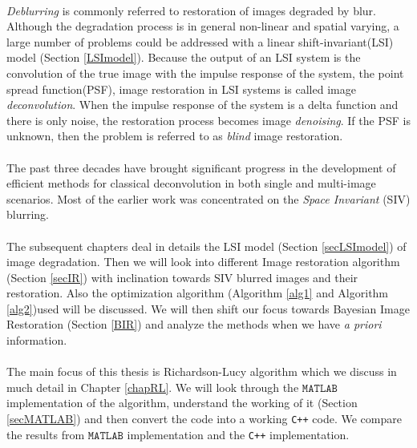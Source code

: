 \documentclass[a4paper]{book}
\begin{document}
	\paragraph*{} \textit{Deblurring} is commonly referred to restoration of images degraded by blur. Although the degradation process is in general non-linear and spatial varying, a large number of problems could be addressed with a linear shift-invariant(LSI) model (Section \ref{LSImodel}). Because the output of an LSI system is the convolution of the true image with the impulse response of the system, the point spread function(PSF), image restoration in LSI systems is called image \textit{deconvolution}. When the impulse response of the system is a delta function and there is only noise, the restoration process becomes image \textit{denoising}. If the PSF is unknown, then the problem is referred to as \textit{blind} image restoration.\cite{bookchapt2}
	
	\paragraph*{}The past three decades have brought significant progress in the development of efficient methods for classical deconvolution in both single and multi-image scenarios. Most of the earlier work was concentrated on the \textit{Space Invariant} (SIV) blurring.\cite{bookchapt3} 
	
	\paragraph*{}The subsequent chapters deal in details the LSI model (Section \ref{secLSImodel}) of image degradation. Then we will look into different Image restoration algorithm (Section \ref{secIR}) with inclination towards SIV blurred images and their restoration. Also the optimization algorithm (Algorithm \ref{alg1} and Algorithm \ref{alg2})used will be discussed.
	We will then shift our focus towards Bayesian Image Restoration (Section \ref{BIR}) and analyze the methods when we have \textit{a priori} information.
	\paragraph*{} The main focus of this thesis is Richardson-Lucy algorithm which we discuss in much detail in Chapter \ref{chapRL}. We will look through the $ \mathtt{MATLAB} $ implementation of the algorithm, understand the working of it (Section \ref{secMATLAB}) and then convert the code into a working \texttt{C++} code. We compare the results from $ \mathtt{MATLAB} $ implementation and the \texttt{C++} implementation.
	
\end{document}
